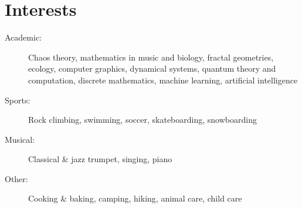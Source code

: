 \documentclass[letterpaper,11pt]{article}
\begin{document}
\section*{Interests}

\begin{description}
\item[Academic:] Chaos theory, mathematics in music and biology, fractal geometries, ecology, computer graphics, dynamical systems, quantum theory and computation, discrete mathematics, machine learning, artificial intelligence

\item[Sports:] Rock climbing, swimming, soccer, skateboarding, snowboarding

\item[Musical:] Classical \& jazz trumpet, singing, piano 

\item[Other:] Cooking \& baking, camping, hiking, animal care, child care
\end{description}
\end{document}
